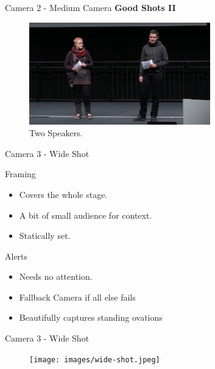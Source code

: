\documentclass[aspectratio=169]{beamer}
\begin{document}
\begin{frame}{Camera 2 - Medium Camera}
	\textbf{Good Shots II}
	\begin{figure} 
		\centering
		\includegraphics[width=0.7\textwidth]{images/Speaker_full.png}
		\caption{Two Speakers.}
	\end{figure}
\end{frame}

\begin{frame}{Camera 3 - Wide Shot}
		\begin{block}{Framing}
			\begin{itemize}
				\item Covers the whole stage.
				\item A bit of small audience for context.
				\item Statically set.
			\end{itemize}
		\end{block}

		\begin{alertblock}{Alerts}
			\begin{itemize}
				\item Needs no attention. 
				\item Fallback Camera if all else fails 
				\item Beautifully captures standing ovations
			\end{itemize}
		\end{alertblock}
\end{frame}

\begin{frame}{Camera 3 - Wide Shot}
	\begin{figure} 
		\centering
		\texttt{[image: images/wide-shot.jpeg]}
	\end{figure}
\end{frame}
\end{document}
